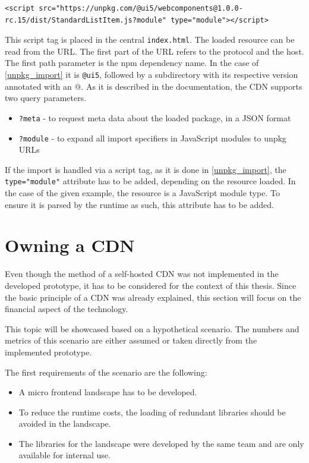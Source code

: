 \begin{lstlisting}[caption=Import of a dependecy using the unpkg API, label=list:unpkg_import]
	<script src="https://unpkg.com/@ui5/webcomponents@1.0.0-rc.15/dist/StandardListItem.js?module" type="module"></script>
\end{lstlisting}

This script tag is placed in the central \texttt{index.html}. The loaded resource can be read from the URL. The first part of the URL refers to the protocol and the host. The first path parameter is the npm dependency name. In the case of \ref{unpkg_import} it is \texttt{@ui5}, followed by a subdirectory with its respective version annotated with an @.
As it is described in the documentation, the CDN supports two query parameters.

\begin{itemize}[noitemsep]
	\item \texttt{?meta} - to request meta data about the loaded package, in a JSON format
	\item \texttt{?module} - to expand all import specifiers in JavaScript modules to unpkg URLs
\end{itemize}

If the import is handled via a script tag, as it is done in \ref{unpkg_import}, the \texttt{type="module"} attribute has to be added, depending on the resource loaded.
In the case of the given example, the resource is a JavaScript module type. To ensure it is parsed by the runtime as such, this attribute has to be added.\cite{js_module_type}

\section{Owning a CDN}

Even though the method of a self-hosted CDN was not implemented in the developed prototype, it has to be considered for the context of this thesis. Since the basic principle of a CDN was already explained, this section will focus on the financial aspect of the technology.

This topic will be showcased based on a hypothetical scenario. The numbers and metrics of this scenario are either assumed or taken directly from the implemented prototype.

The first requirements of the scenario are the following:

\begin{itemize}[noitemsep]
	\item A micro frontend landscape has to be developed. 
	\item To reduce the runtime costs, the loading of redundant libraries should be avoided in the landscape.
	\item The libraries for the landscape were developed by the same team and are only available for internal use.
\end{itemize} 

